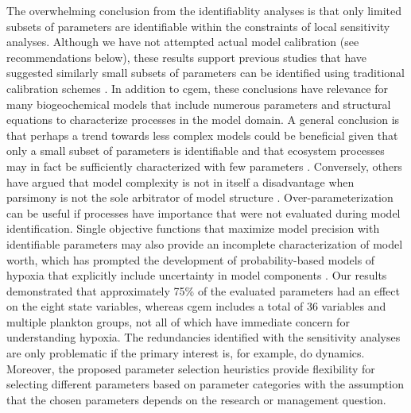 \documentclass[letterpaper,12pt,oneside]{article}\usepackage[]{graphicx}\usepackage[]{color}
\begin{document}
The overwhelming conclusion from the identifiablity analyses is that only limited subsets of parameters are identifiable within the constraints of local sensitivity analyses. Although we have not attempted actual model calibration (see recommendations below), these results support previous studies that have suggested similarly small subsets of parameters can be identified using traditional calibration schemes \citep[e.g.,][]{Wheater86,Ye97,Omlin01}.  In addition to \ac{cgem}, these conclusions have relevance for many biogeochemical models that include numerous parameters and structural equations to characterize processes in the model domain.  A general conclusion is that perhaps a trend towards less complex models could be beneficial given that only a small subset of parameters is identifiable and that ecosystem processes may in fact be sufficiently characterized with few parameters \citep{Ye97}.  Conversely, others have argued that model complexity is not in itself a disadvantage when parsimony is not the sole arbitrator of model structure \citep{Reichert97}. Over-parameterization can be useful if processes have importance that were not evaluated during model identification.  Single objective functions that maximize model precision with identifiable parameters may also provide an incomplete characterization of model worth, which has prompted the development of probability-based models of hypoxia that explicitly include uncertainty in model components \citep[e.g.][]{Obenour15}.  Our results demonstrated that approximately 75\% of the evaluated parameters had an effect on the eight state variables, whereas \ac{cgem} includes a total of 36 variables and multiple plankton groups, not all of which have immediate concern for understanding hypoxia. The redundancies identified with the sensitivity analyses are only problematic if the primary interest is, for example, \ac{do} dynamics.  Moreover, the proposed parameter selection heuristics provide flexibility for selecting different parameters based on parameter categories with the assumption that the chosen parameters depends on the research or management question. 
\end{document}
